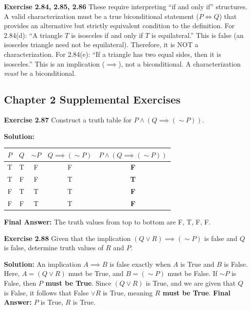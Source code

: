 \documentclass[12pt]{article}
\begin{document}
\textbf{Exercise 2.84, 2.85, 2.86}
These require interpreting ``if and only if'' structures. A valid characterization must be a true biconditional statement ($P \iff Q$) that provides an alternative but strictly equivalent condition to the definition. 
For 2.84(d): ``A triangle $T$ is isosceles if and only if $T$ is equilateral.'' This is false (an isosceles triangle need not be equilateral). Therefore, it is NOT a characterization.
For 2.84(e): ``If a triangle has two equal sides, then it is isosceles.'' This is an implication ($\implies$), not a biconditional. A characterization \textit{must} be a biconditional.

\subsection{Chapter 2 Supplemental Exercises}

\textbf{Exercise 2.87}
Construct a truth table for $P \land (Q \implies (\sim P))$.
\begin{mdframed}
\textbf{Solution:}
\begin{center}
\begin{tabular}{|c|c|c|c|c|}
\hline
$P$ & $Q$ & $\sim P$ & $Q \implies (\sim P)$ & $P \land (Q \implies (\sim P))$ \\ \hline
T & T & F & F & \textbf{F} \\ \hline
T & F & F & T & \textbf{T} \\ \hline
F & T & T & T & \textbf{F} \\ \hline
F & F & T & T & \textbf{F} \\ \hline
\end{tabular}
\end{center}
\textbf{Final Answer:} The truth values from top to bottom are F, T, F, F.
\end{mdframed}

\textbf{Exercise 2.88}
Given that the implication $(Q \lor R) \implies (\sim P)$ is false and $Q$ is false, determine truth values of $R$ and $P$.
\begin{mdframed}
\textbf{Solution:}
An implication $A \implies B$ is false exactly when $A$ is True and $B$ is False.
Here, $A = (Q \lor R)$ must be True, and $B = (\sim P)$ must be False.
If $\sim P$ is False, then \textbf{$P$ must be True}.
Since $(Q \lor R)$ is True, and we are given that $Q$ is False, it follows that False $\lor R$ is True, meaning \textbf{$R$ must be True}.
\textbf{Final Answer:} $P$ is True, $R$ is True.
\end{mdframed}
\end{document}

